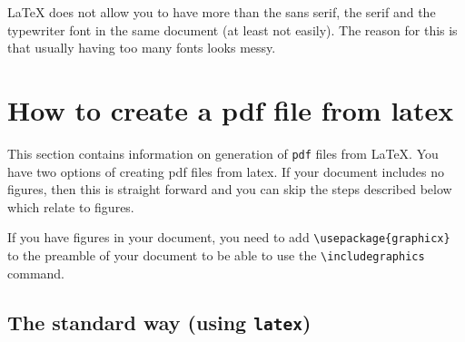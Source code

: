 \documentclass[12pt,a4paper]{article}
\begin{document}
LaTeX does not allow you to have more than the sans serif, the serif
and the typewriter font in the same document (at least not
easily). The reason for this is that usually having too many fonts
looks messy.




\section{How to create a pdf file from latex}
\label{sec:how-create-pdf}
\label{pdffromlatex}

This section contains information on generation of \texttt{pdf} files
from LaTeX. You have two options of creating pdf files from latex. 
If your document includes no figures, then this is straight forward
and you can skip the steps described below which relate to figures.

If you have figures in your document, you need to add
\verb|\usepackage{graphicx}| to the preamble of your document to be able
to use the \verb|\includegraphics| command.

\subsection{The standard way (using \texttt{latex})} 
\end{document}
